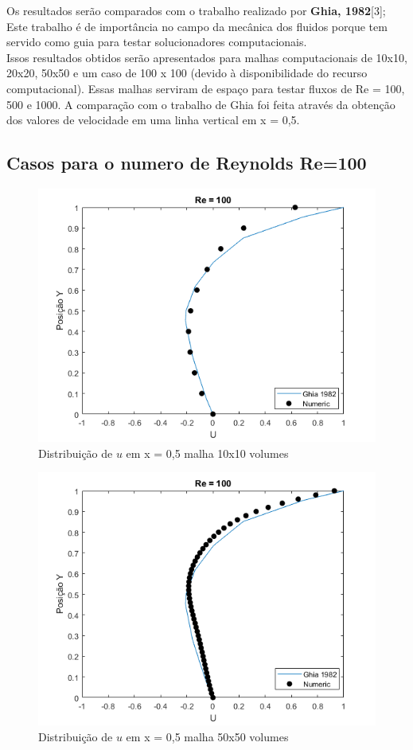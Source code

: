 \documentclass[]{article}
\begin{document}
Os resultados serão comparados com o trabalho realizado por \textbf{Ghia, 1982}[3]; Este trabalho é de importância no campo da mecânica dos fluidos porque tem servido como guia para testar solucionadores computacionais.\\

Issos resultados obtidos serão apresentados para malhas computacionais de 10x10, 20x20, 50x50 e um caso de 100 x 100 (devido à disponibilidade do recurso computacional). Essas malhas serviram de espaço para testar fluxos de Re = 100, 500 e 1000. A comparação com o trabalho de Ghia foi feita através da obtenção dos valores de velocidade em uma linha vertical em x = 0,5. 

\subsection*{Casos para o numero de Reynolds Re=100}


\begin{figure}[H]
	\centering
	\includegraphics[width=.65\textwidth]{figures/3}
	\caption{Distribuição de $u$ em x = 0,5 malha 10x10 volumes}
\end{figure}

\begin{figure}[H]
	\centering
	\includegraphics[width=.65\textwidth]{figures/4}
	\caption{Distribuição de $u$ em x = 0,5 malha 50x50 volumes}
\end{figure}
\end{document}

